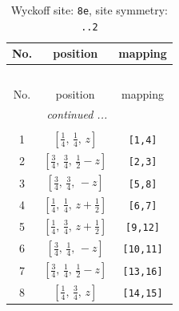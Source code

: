 \documentclass[fleqn,8pt]{jsarticle}
\begin{document}
\begin{longtable}{ccc}
\caption{Wyckoff site: {\tt 8e}, site symmetry: {\tt ..2}}
 \\
 \hline \hline
No. & position & mapping \\ \hline \endfirsthead

\multicolumn{2}{l}{\tablename\ \thetable{}} \\
 \hline \hline
No. & position & mapping \\ \hline \endhead

 \hline \hline
\multicolumn{2}{r}{\footnotesize\it continued ...} \\ \endfoot

 \hline \hline
\multicolumn{2}{r}{} \\ \endlastfoot

1 & $\left[ \frac{1}{4},\, \frac{1}{4},\, z \right]$ & {\tt [1,4]} \\ \hline
2 & $\left[ \frac{3}{4},\, \frac{3}{4},\, \frac{1}{2} - z \right]$ & {\tt [2,3]} \\ \hline
3 & $\left[ \frac{3}{4},\, \frac{3}{4},\, - z \right]$ & {\tt [5,8]} \\ \hline
4 & $\left[ \frac{1}{4},\, \frac{1}{4},\, z + \frac{1}{2} \right]$ & {\tt [6,7]} \\ \hline
5 & $\left[ \frac{1}{4},\, \frac{3}{4},\, z + \frac{1}{2} \right]$ & {\tt [9,12]} \\ \hline
6 & $\left[ \frac{3}{4},\, \frac{1}{4},\, - z \right]$ & {\tt [10,11]} \\ \hline
7 & $\left[ \frac{3}{4},\, \frac{1}{4},\, \frac{1}{2} - z \right]$ & {\tt [13,16]} \\ \hline
8 & $\left[ \frac{1}{4},\, \frac{3}{4},\, z \right]$ & {\tt [14,15]} \\
\end{longtable}
\renewcommand{\arraystretch}{1.2}
\end{document}
